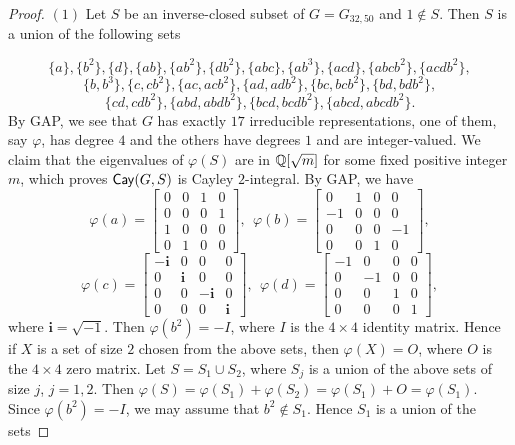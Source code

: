 \documentclass{amsart}
\def\Cay{{\sf Cay}} \def\Ker{{\sf Ker}}
\begin{document}
\begin{proof}
	$(1)$ Let $S$ be an inverse-closed subset of $G=G_{32,50}$ and $1\notin S$. Then
	$S$ is a union of the following sets
	
	
	$$\{ a \}, \{ b^2 \}, \{ d \}, \{ ab \}, \{ ab^2 \},\{ db^2 \},	\{ abc \},\{ ab^3 \},\{ acd \}, \{ abcb^2 \}, \{ acdb^2 \},$$
	$$ 
	\{ b, b^3\}, \{ c, cb^2 \},\{ ac, acb^2 \},
	\{ ad, adb^2 \}, \{ bc, bcb^2 \}, \{ bd, bdb^2 \},$$
	$$\{ cd, cdb^2 \}, \{ abd, abdb^2 \},   \{ bcd, bcdb^2 \},
	\{ abcd, abcdb^2 \}. $$
	By GAP, we see that $G$ has exactly $17$ irreducible representations, one of them, say $\varphi$, has degree $4$ and the others have degrees $1$ and are integer-valued. We claim that the eigenvalues of $\varphi(S)$ are in $\Bbb Q[\sqrt{m}]$ for some fixed positive integer $m$, which  proves $\Cay(G,S)$ is Cayley $2$-integral.  By GAP, we have
	\begin{equation*}
		\varphi(a)=\begin{bmatrix}
			0& 0&1&0 \\
			0&0&0&1\\
			1&0&0&0\\
			0&1&0&0
		\end{bmatrix},~~	\varphi(b)=\begin{bmatrix}
			0& 1&0&0 \\
			-1&0&0&0\\
			0&0&0&-1\\
			0&0&1&0
		\end{bmatrix},
	\end{equation*}
	\begin{equation*}
		\varphi(c)=\begin{bmatrix}
			-\textbf{i}& 0&0&0 \\
			0&\textbf{i}&0&0\\
			0&0&-\textbf{i}&0\\
			0&0&0&\textbf{i}
		\end{bmatrix},~~	\varphi(d)=\begin{bmatrix}
			-1& 0&0&0 \\
			0&-1&0&0\\
			0&0&1&0\\
			0&0&0&1
		\end{bmatrix},
	\end{equation*}
	where $\textbf{i}=\sqrt{-1}$. Then $\varphi(b^2)=-I$, where $I$ is the $4\times 4$ identity matrix. Hence if $X$ is a set of size $2$ chosen from the above sets, then $\varphi(X)=O$, where $O$ is the $4\times 4$ zero matrix. Let $S=S_1\cup S_2$, where $S_j$ is a union of the above sets of size $j$, $j=1,2$. Then $\varphi(S)=\varphi(S_1)+\varphi(S_2)=\varphi(S_1)+O=\varphi(S_1)$. Since $\varphi(b^2)=-I$, we may assume that $b^2\notin S_1$. Hence $S_1$ is a union of the sets 

\end{proof}
\end{document}
